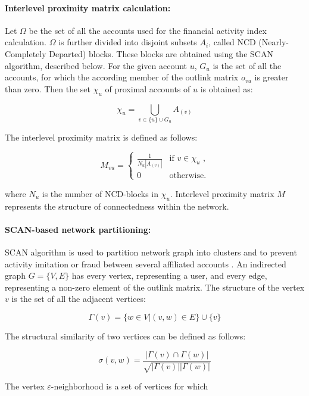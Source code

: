 \documentclass[a4paper,12pt]{article}
\begin{document}
\paragraph{Interlevel proximity matrix calculation:}
Let $\Omega$ be the set of all the accounts used for the financial activity index calculation. $\Omega$ is further divided into disjoint subsets $A_i$, called NCD (Nearly-Completely Departed) blocks. These blocks are obtained using the SCAN algorithm, described below. For the given account $u$, $G_u$ is the set of all the accounts, for which the according member of the outlink matrix $o_{vu}$ is greater than zero. Then the set $\chi_u$ of proximal accounts of $u$ is obtained as: 



$$
\chi_u = \bigcup_{v \in \{u\} \cup G_u} A_{(v)}
$$

The interlevel proximity matrix is defined as follows:



$$
M_{vu}=\begin{cases}
 \frac{1}{N_u |A_{(v)}|}
 & \text{if $v \in \chi_u$ ,}\\
 0 & \text{otherwise.}
\end{cases}
$$

where $N_u$ is the number of NCD-blocks in $\chi_u$. Interlevel proximity matrix $M$ represents the structure of connectedness within the network.



\paragraph{SCAN-based network partitioning:}
SCAN algorithm is used to partition network graph into clusters and to prevent activity imitation or fraud between several affiliated accounts \cite{SCAN}. An indirected graph $G = \{V, E\}$ has every vertex, representing a user, and every edge, representing a non-zero element of the outlink matrix. The structure of the vertex $v$ is the set of all the adjacent vertices:


$$
\Gamma(v)=\{w \in V|(v,w) \in E\} \cup \{v\}
$$

The structural similarity of two vertices can be defined as follows:



$$
\sigma(v,w)=\frac{ |\Gamma(v) \cap \Gamma(w)|}{\sqrt{|\Gamma(v)||\Gamma(w)|}}
$$

The vertex $\varepsilon$-neighborhood is a set of vertices for which
\end{document}
